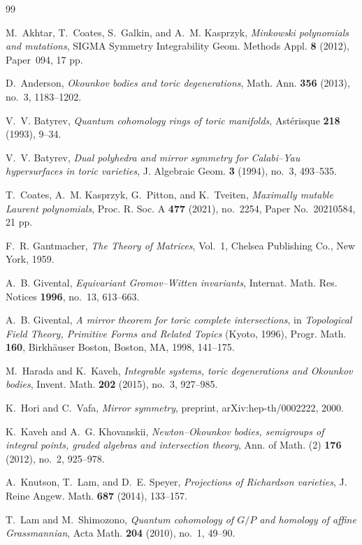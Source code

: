 \begin{thebibliography}{99}

M.~Akhtar, T.~Coates, S.~Galkin, and A.~M. Kasprzyk,
\emph{Minkowski polynomials and mutations},
SIGMA Symmetry Integrability Geom. Methods Appl. \textbf{8} (2012),
Paper~094, 17 pp.

D.~Anderson,
\emph{Okounkov bodies and toric degenerations},
Math. Ann. \textbf{356} (2013), no.~3, 1183--1202.

V.~V. Batyrev,
\emph{Quantum cohomology rings of toric manifolds},
Ast\'erisque \textbf{218} (1993), 9--34.

V.~V. Batyrev,
\emph{Dual polyhedra and mirror symmetry for Calabi--Yau hypersurfaces in toric varieties},
J. Algebraic Geom. \textbf{3} (1994), no.~3, 493--535.

T.~Coates, A.~M. Kasprzyk, G.~Pitton, and K.~Tveiten,
\emph{Maximally mutable Laurent polynomials},
Proc. R. Soc. A \textbf{477} (2021), no.~2254, Paper No.~20210584,
21 pp.

F.~R. Gantmacher,
\emph{The Theory of Matrices}, Vol.~1,
Chelsea Publishing Co., New York, 1959.

A.~B. Givental,
\emph{Equivariant Gromov--Witten invariants},
Internat. Math. Res. Notices \textbf{1996}, no.~13, 613--663.

A.~B. Givental,
\emph{A mirror theorem for toric complete intersections},
in \emph{Topological Field Theory, Primitive Forms and Related Topics}
(Kyoto, 1996), Progr. Math. \textbf{160},
Birkh\"auser Boston, Boston, MA, 1998, 141--175.

M.~Harada and K.~Kaveh,
\emph{Integrable systems, toric degenerations and Okounkov bodies},
Invent. Math. \textbf{202} (2015), no.~3, 927--985.

K.~Hori and C.~Vafa,
\emph{Mirror symmetry},
preprint, arXiv:hep-th/0002222, 2000.

K.~Kaveh and A.~G. Khovanskii,
\emph{Newton--Okounkov bodies, semigroups of integral points, graded algebras and intersection theory},
Ann. of Math. (2) \textbf{176} (2012), no.~2, 925--978.

A.~Knutson, T.~Lam, and D.~E. Speyer,
\emph{Projections of Richardson varieties},
J. Reine Angew. Math. \textbf{687} (2014), 133--157.

T.~Lam and M.~Shimozono,
\emph{Quantum cohomology of \(G/P\) and homology of affine Grassmannian},
Acta Math. \textbf{204} (2010), no.~1, 49--90.


\end{thebibliography}
